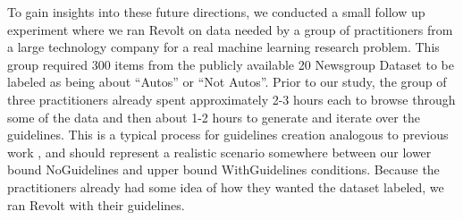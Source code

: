 To gain insights into these future directions, we conducted a small follow up experiment where we ran Revolt on data needed by a group of practitioners from a large technology company for a real machine learning research problem. 
This group required 300 items from the publicly available 20 Newsgroup Dataset \cite{Newsgroups20} to be labeled as being about ``Autos'' or ``Not Autos''.
Prior to our study, the group of three practitioners already spent approximately 2-3 hours each to browse through some of the data and then about 1-2 hours to generate and iterate over the guidelines. This is a typical process for guidelines creation analogous to previous work  \cite{wiebe1999development}, and should represent a realistic scenario somewhere between our lower bound NoGuidelines and upper bound WithGuidelines conditions. Because the practitioners already had some idea of how they wanted the dataset labeled, we ran Revolt with their guidelines. %

